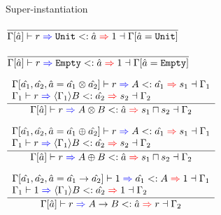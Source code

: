 \documentclass{beamer}
\begin{document}
\begin{frame}{Super-instantiation}

\begin{center}
  $\infrule{}{\superinst{\holectx{\Gamma}{\evar{a}}}{r}{\Unit}{\evar{a}}{\One}{\holectx{\Gamma}{\evar{a}[\Unit]}}}$

  \vspace{1em}

  $\infrule{}{\superinst{\holectx{\Gamma}{\evar{a}}}{r}{\Empty}{\evar{a}}{\One}{\holectx{\Gamma}{\evar{a}[\Empty]}}}$

  \vspace{1em}

  $\infrule{\begin{array}{l} \superinst{\holectx{\Gamma}{\evar{a_1}, \evar{a_2}, \evar{a}[\Prod{\evar{a_1}}{\evar{a_2}}]}}{r}{A}{\evar{a_1}}{s_1}{\Gamma_1} \\ \superinst{\Gamma_1}{r}{\substctx{\Gamma_1}{B}}{\evar{a_2}}{s_2}{\Gamma_2} \end{array}}{\superinst{\holectx{\Gamma}{\evar{a}}}{r}{\Prod{A}{B}}{\evar{a}}{\glbqty{s_1}{s_2}}{\Gamma_2}}$

  \vspace{1em}

  $\infrule{\begin{array}{l} \superinst{\holectx{\Gamma}{\evar{a_1}, \evar{a_2}, \evar{a}[\Sum{\evar{a_1}}{\evar{a_2}}]}}{r}{A}{\evar{a_1}}{s_1}{\Gamma_1} \\ \superinst{\Gamma_1}{r}{\substctx{\Gamma_1}{B}}{\evar{a_2}}{s_2}{\Gamma_2} \end{array}}{\superinst{\holectx{\Gamma}{\evar{a}}}{r}{\Sum{A}{B}}{\evar{a}}{\glbqty{s_1}{s_2}}{\Gamma_2}}$

  \vspace{1em}

  $\infrule{\begin{array}{l} \subinst{\holectx{\Gamma}{\evar{a_1}, \evar{a_2}, \evar{a}[\Fun{\evar{a_1}}{\evar{a_2}}]}}{\One}{\evar{a_1}}{A}{\One}{\Gamma_1} \\ \superinst{\Gamma_1}{\One}{\substctx{\Gamma_1}{B}}{\evar{a_2}}{\One}{\Gamma_2} \end{array}}{\superinst{\holectx{\Gamma}{\evar{a}}}{r}{\Fun{A}{B}}{\evar{a}}{r}{\Gamma_2}}$
\end{center}

\end{frame}
\end{document}

